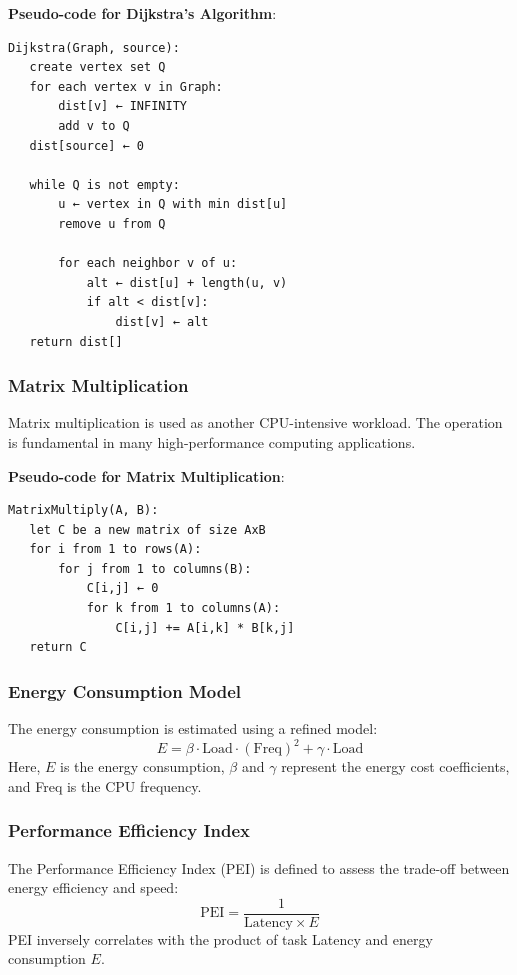\documentclass[conference]{IEEEtran}
\begin{document}
\textbf{Pseudo-code for Dijkstra's Algorithm}:
\begin{verbatim}
Dijkstra(Graph, source):
   create vertex set Q
   for each vertex v in Graph:             
       dist[v] ← INFINITY                 
       add v to Q                      
   dist[source] ← 0                        
   
   while Q is not empty:
       u ← vertex in Q with min dist[u]   
       remove u from Q 
       
       for each neighbor v of u:           
           alt ← dist[u] + length(u, v)
           if alt < dist[v]:               
               dist[v] ← alt 
   return dist[]
\end{verbatim}

\subsubsection{Matrix Multiplication}
Matrix multiplication is used as another CPU-intensive workload. The operation is fundamental in many high-performance computing applications.

\textbf{Pseudo-code for Matrix Multiplication}:
\begin{verbatim}
MatrixMultiply(A, B):
   let C be a new matrix of size AxB
   for i from 1 to rows(A):
       for j from 1 to columns(B):
           C[i,j] ← 0
           for k from 1 to columns(A):
               C[i,j] += A[i,k] * B[k,j]
   return C
\end{verbatim}
\subsubsection{Energy Consumption Model}
The energy consumption is estimated using a refined model:
\begin{equation}
    E = \beta \cdot \text{Load} \cdot (\text{Freq})^2 + \gamma \cdot \text{Load}
\end{equation}
Here, \( E \) is the energy consumption, \( \beta \) and \( \gamma \) represent the energy cost coefficients, and Freq is the CPU frequency.

\subsubsection{Performance Efficiency Index}
The Performance Efficiency Index (PEI) is defined to assess the trade-off between energy efficiency and speed:
\begin{equation}
    \text{PEI} = \frac{1}{\text{Latency} \times E}
\end{equation}
PEI inversely correlates with the product of task Latency and energy consumption \( E \). 
\end{document}
